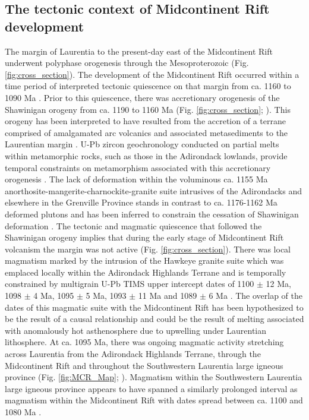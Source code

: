 \documentclass[11pt,letterpaper]{article}
\begin{document}
\subsection{The tectonic context of Midcontinent Rift development}

The margin of Laurentia to the present-day east of the Midcontinent Rift underwent polyphase orogenesis through the Mesoproterozoic (Fig. \ref{fig:cross_section}). The development of the Midcontinent Rift occurred within a time period of interpreted tectonic quiescence on that margin from ca. 1160 to 1090 Ma \citep{Rivers2008a, McLelland_ref}. Prior to this quiescence, there was accretionary orogenesis of the Shawinigan orogeny from ca. 1190 to 1160 Ma (Fig. \ref{fig:cross_section}; \citealp{McLelland_ref}). This orogeny has been interpreted to have resulted from the accretion of a terrane comprised of amalgamated arc volcanics and associated metasediments to the Laurentian margin \citep{McLelland_ref}. U-Pb zircon geochronology conducted on partial melts within metamorphic rocks, such as those in the Adirondack lowlands, provide temporal constraints on metamorphism associated with this accretionary orogenesis \citep{Heumann2006a}. The lack of deformation within the voluminous ca. 1155 Ma anorthosite-mangerite-charnockite-granite suite intrusives of the Adirondacks and elsewhere in the Grenville Province stands in contrast to ca. 1176-1162 Ma deformed plutons and has been inferred to constrain the cessation of Shawinigan deformation \citep{McLelland_ref}. The tectonic and magmatic quiescence that followed the Shawinigan orogeny implies that during the early stage of Midcontinent Rift volcanism the margin was not active (Fig. \ref{fig:cross_section}). There was local magmatism marked by the intrusion of the Hawkeye granite suite which was emplaced locally within the Adirondack Highlands Terrane and is temporally constrained by multigrain U-Pb TIMS upper intercept dates of 1100 $\pm$ 12 Ma, 1098 $\pm$ 4 Ma, 1095 $\pm$ 5 Ma, 1093 $\pm$ 11 Ma and 1089 $\pm$ 6 Ma \citep{Chiarenzelli1991a}. The overlap of the dates of this magmatic suite with the Midcontinent Rift has been hypothesized to be the result of a causal relationship \citep{McLelland_ref} and could be the result of melting associated with anomalously hot asthenosphere due to upwelling under Laurentian lithosphere. At ca. 1095 Ma, there was ongoing magmatic activity stretching across Laurentia from the Adirondack Highlands Terrane, through the Midcontinent Rift and throughout the Southwestern Laurentia large igneous province (Fig. \ref{fig:MCR_Map}; \citealp{Bright2014a}). Magmatism within the Southwestern Laurentia large igneous province appears to have spanned a similarly prolonged interval as magmatism within the Midcontinent Rift with dates spread between ca. 1100 and 1080 Ma \citep{Bright2014a}.
\end{document}
